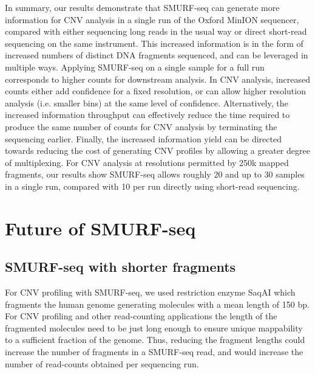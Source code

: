 In summary, our results demonstrate that SMURF-seq can generate more
information for CNV analysis in a single run of the Oxford MinION
sequencer, compared with either sequencing long reads in the usual way or
direct short-read sequencing on the same instrument.  This increased
information is in the form of increased numbers of distinct DNA
fragments sequenced, and can be leveraged in multiple ways. Applying
SMURF-seq on a single sample for a full run corresponds to higher counts
for downstream analysis. In CNV analysis, increased counts either add
confidence for a fixed resolution, or can allow higher resolution
analysis (i.e. smaller bins) at the same level of confidence.
Alternatively, the increased information throughput can effectively
reduce the time required to produce the same number of counts for CNV
analysis by terminating the sequencing earlier. Finally, the increased
information yield can be directed towards reducing the cost of
generating CNV profiles by allowing a greater degree of multiplexing.
For CNV analysis at resolutions permitted by 250k mapped fragments, our
results show SMURF-seq allows roughly 20 and up to 30 samples in a
single run, compared with 10 per run directly using short-read
sequencing.

\section{Future of SMURF-seq}
\label{future_smurf}

\subsection*{SMURF-seq with shorter fragments}
For CNV profiling with SMURF-seq, we used restriction enzyme SaqAI which
fragments the human genome generating molecules with a mean length of
150 bp. For CNV profiling and other read-counting applications the
length of the fragmented molecules need to be just long enough to ensure
unique mappability to a sufficient fraction of the genome. Thus,
reducing the fragment lengths could increase the number of
fragments in a SMURF-seq read, and would increase the number of
read-counts obtained per sequencing run.

